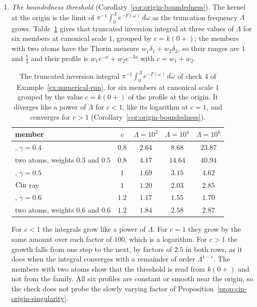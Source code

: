 \begin{example}
\begin{enumerate}
\item \emph{The boundedness threshold} (Corollary~\ref{cor:origin-boundedness}). The kernel at
the origin is the limit of $\pi^{-1}\int_0^\Lambda e^{-F(\omega)}\,d\omega$ as the truncation
frequency $\Lambda$ grows. Table~\ref{tab:threshold-run} gives that truncated inversion integral at three values of
$\Lambda$ for six members at canonical scale $1$, grouped by $c = k(0{+})$; the members with
two atoms have the Thorin measure $w_1\delta_1 + w_2\delta_3$, so their ranges are $1$ and
$\tfrac13$ and their profile is $w_1e^{-x} + w_2e^{-3x}$ with $c = w_1 + w_2$.
\begin{table}[!htb]
\centering
\caption{The truncated inversion integral $\pi^{-1}\int_0^\Lambda e^{-F(\omega)}\,d\omega$ of check 4 of
Example~\ref{ex:numerical-run}, for six members at canonical scale $1$ grouped by the value
$c = k(0{+})$ of the profile at the origin. It diverges like a power of $\Lambda$ for $c < 1$,
like its logarithm at $c = 1$, and converges for $c > 1$
(Corollary~\ref{cor:origin-boundedness}).}
\label{tab:threshold-run}
\small
\begin{tabular}{lcccc}
\toprule
member & $c$ & $\Lambda = 10^2$ & $\Lambda = 10^4$ & $\Lambda = 10^6$ \\
\midrule
\Matern{}, $\gamma = 0.4$ & $0.8$ & $2.64$ & $8.68$ & $23.87$ \\
two atoms, weights $0.3$ and $0.5$ & $0.8$ & $4.17$ & $14.64$ & $40.94$ \\
\Matern{}, $\gamma = 0.5$ & $1$ & $1.69$ & $3.15$ & $4.62$ \\
$\operatorname{Cin}$ ray & $1$ & $1.20$ & $2.03$ & $2.85$ \\
\Matern{}, $\gamma = 0.6$ & $1.2$ & $1.17$ & $1.55$ & $1.70$ \\
two atoms, weights $0.6$ and $0.6$ & $1.2$ & $1.84$ & $2.58$ & $2.87$ \\
\bottomrule
\end{tabular}
\end{table}
For $c < 1$ the integrals grow like a power of $\Lambda$. For $c = 1$ they grow by the same
amount over each factor of $100$, which is a logarithm. For $c > 1$ the growth falls from one
step to the next, by factors of $2.5$ in both rows, as it does when the integral converges
with a remainder of order $\Lambda^{1-c}$. The members with two atoms show that the threshold
is read from $k(0{+})$ and not from the family. All six profiles are constant or smooth near
the origin, so the check does not probe the slowly varying factor of
Proposition~\ref{prop:cin-origin-singularity}.

\end{enumerate}
\end{example}
